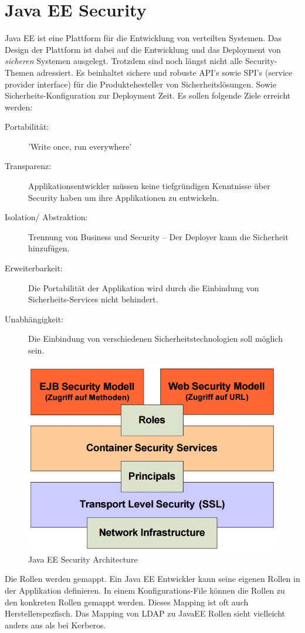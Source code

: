 \section{Java EE Security}
Java EE ist eine Plattform für die Entwicklung von verteilten Systemen. Das Design der Plattform ist dabei auf die Entwicklung und das Deployment von \emph{sicheren} Systemen ausgelegt. Trotzdem sind noch längst nicht alle Security-Themen adressiert. Es beinhaltet sichere und robuste API's sowie SPI's (service provider interface) für die Produktehesteller von Sicherheitslösungen. Sowie Sicherheits-Konfiguration zur Deployment Zeit. Es sollen folgende Ziele erreicht werden:

\begin{description}
	\item[Portabilität:] 'Write once, run everywhere'
	\item[Transparenz:] Applikationsentwickler müssen keine tiefgründigen Kenntnisse über Security haben um ihre Applikationen zu	entwickeln.
	\item[Isolation/ Abstraktion:] Trennung von Business und Security –	Der Deployer kann die Sicherheit hinzufügen.
	\item[Erweiterbarkeit:] Die Portabilität der Applikation wird durch die	Einbindung von Sicherheits-Services nicht behindert.
	\item[Unabhängigkeit:] Die Einbindung von verschiedenen	Sicherheitstechnologien soll möglich sein.
\end{description}

\begin{figure}[h!]
\centering
\includegraphics[width=0.7\linewidth]{fig/java-ee-security}
\caption{Java EE Security Architecture}
\label{fig:java-ee-security}
\end{figure}

Die Rollen werden gemappt. Ein Java EE Entwickler kann seine eigenen Rollen in der Applikation definieren. In einem Konfigurations-File können die Rollen zu den konkreten Rollen gemappt werden. Dieses Mapping ist oft auch Herstellerspezfisch. Das Mapping von LDAP zu JavaEE Rollen sieht vielleicht anders aus als bei Kerberos.

